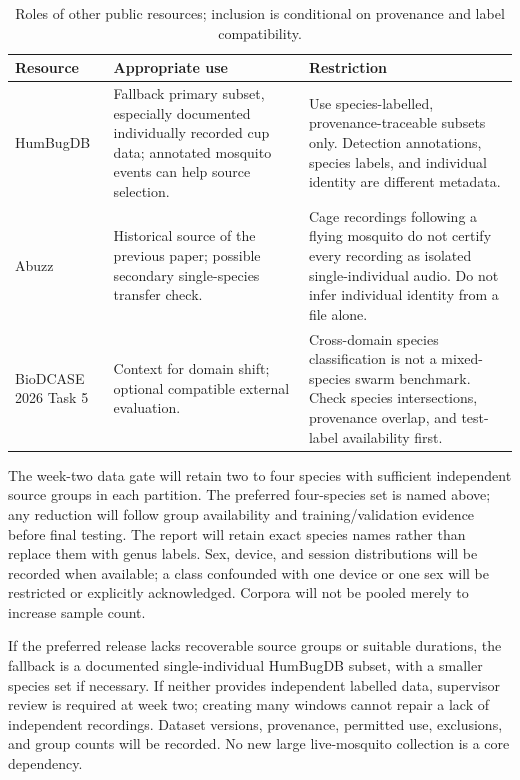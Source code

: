 \documentclass[a4paper,11pt]{article}
\begin{document}
\begin{table}[htbp]
\centering\small
\caption{Roles of other public resources; inclusion is conditional on provenance and label compatibility.}
\label{tab:data}
\begin{tabularx}{\linewidth}{P{2.6cm}Y Y}
\toprule
\textbf{Resource} & \textbf{Appropriate use} & \textbf{Restriction}\\\midrule
HumBugDB \cite{humbug} & Fallback primary subset, especially documented individually recorded cup data; annotated mosquito events can help source selection. & Use species-labelled, provenance-traceable subsets only. Detection annotations, species labels, and individual identity are different metadata.\\
Abuzz \cite{abuzz,abuzzdata} & Historical source of the previous paper; possible secondary single-species transfer check. & Cage recordings following a flying mosquito do not certify every recording as isolated single-individual audio. Do not infer individual identity from a file alone.\\
BioDCASE 2026 Task 5 \cite{biodcase} & Context for domain shift; optional compatible external evaluation. & Cross-domain species classification is not a mixed-species swarm benchmark. Check species intersections, provenance overlap, and test-label availability first.\\
\bottomrule
\end{tabularx}
\end{table}

The week-two data gate will retain two to four species with sufficient independent source groups in each partition. The preferred four-species set is named above; any reduction will follow group availability and training/validation evidence before final testing. The report will retain exact species names rather than replace them with genus labels. Sex, device, and session distributions will be recorded when available; a class confounded with one device or one sex will be restricted or explicitly acknowledged. Corpora will not be pooled merely to increase sample count.

If the preferred release lacks recoverable source groups or suitable durations, the fallback is a documented single-individual HumBugDB subset, with a smaller species set if necessary. If neither provides independent labelled data, supervisor review is required at week two; creating many windows cannot repair a lack of independent recordings. Dataset versions, provenance, permitted use, exclusions, and group counts will be recorded. No new large live-mosquito collection is a core dependency.
\end{document}
